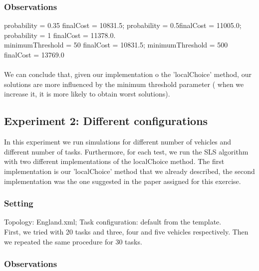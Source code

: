 \documentclass[11pt]{article}
\begin{document}
\subsubsection{Observations}
probability = 0.35 \textrightarrow finalCost = 10831.5; probability = 0.5\textrightarrow finalCost = 11005.0;   probability = 1 \textrightarrow finalCost = 11378.0.
\\
minimumThreshold = 50 \textrightarrow finalCost = 10831.5; minimumThreshold = 500 \textrightarrow finalCost = 13769.0
\\
\\
We can conclude that, given our implementation o the 'localChoice' method, our solutions are more influenced by the minimum threshold parameter ( when we increase it, it is more likely to obtain worst solutions).

\subsection{Experiment 2: Different configurations}
In this experiment we run simulations for different number of vehicles and different number of tasks. Furthermore, for each test, we run the SLS algorithm with two different implementations of the localChoice method. The first implementation is our 'localChoice' method that we already described, the second implementation was the one suggested in the paper assigned for this exercise.
\subsubsection{Setting}
Topology: England.xml; Task configuration: default from the template.
\\
First, we tried with 20 tasks and three, four and five vehicles respectively. Then we repeated the same procedure for 30 tasks.

\subsubsection{Observations}
\end{document}
